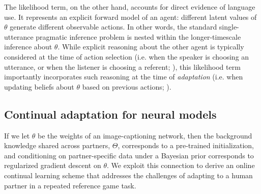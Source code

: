 \documentclass[11pt,a4paper]{article}
\begin{document}
The likelihood term, on the other hand, accounts for direct evidence of language use.
It represents an explicit forward model of an agent: different latent values of $\theta$ generate different observable actions.
In other words, the standard single-utterance pragmatic inference problem is nested within the longer-timescale inference about $\theta$. 
While explicit reasoning about the other agent is typically considered at the time of action selection (i.e. when the speaker is choosing an utterance, or when the listener is choosing a referent; \citealp{GoodmanFrank16_RSATiCS,andreas2016reasoning}), this likelihood term importantly incorporates such reasoning at the time of \emph{adaptation} (i.e. when updating beliefs about $\theta$ based on previous actions; \citealp{FrankGoodmanTenenbaum09_Wurwur, SmithGoodmanFrank13_RecursivePragmaticReasoningNIPS}).



\subsection{Continual adaptation for neural models}
\label{sec:neural}

If we let $\theta$ be the weights of an image-captioning network, then the background knowledge shared across partners, $\Theta$, corresponds to a pre-trained initialization, and conditioning on partner-specific data under a Bayesian prior corresponds to regularized gradient descent on $\theta$.
We exploit this connection to derive an online continual learning scheme that addresses the challenges of adapting to a human partner in a repeated reference game task. 

\end{document}
